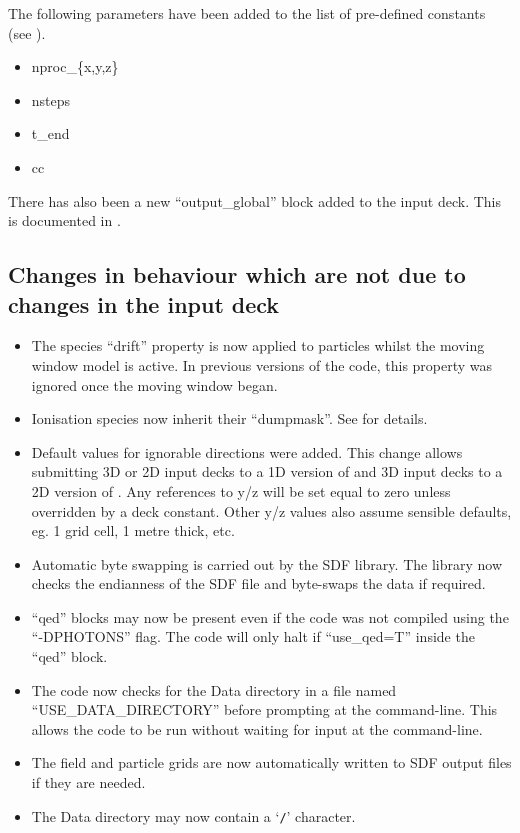 \noindent The following parameters have been added to the list of pre-defined
constants (see ).
\begin{itemize}
\item nproc\_\{x,y,z\}
\item nsteps
\item t\_end
\item cc
\end{itemize}
\bigskip

\noindent There has also been a new ``output\_global'' block added to the
input deck. This is documented in .

\subsection{Changes in behaviour which are not due to changes in the input deck}
\begin{itemize}
\item The species ``drift'' property is now applied to particles whilst the
  moving window model is active. In previous versions of the code, this
  property was ignored once the moving window began.
\item Ionisation species now inherit their ``dumpmask''. See 
  for details.
\item Default values for ignorable directions were added.
   This change allows submitting 3D or 2D input decks to a 1D
   version of {\EPOCH} and 3D input decks to a 2D version of {\EPOCH}.
   Any references to y/z will be set equal to zero unless overridden
   by a deck constant. Other y/z values also assume sensible
   defaults, eg. 1 grid cell, 1 metre thick, etc.
\item Automatic byte swapping is carried out by the SDF library.
   The library now checks the endianness of the SDF file and
   byte-swaps the data if required.
\item ``qed'' blocks may now be present even if the code was not compiled
   using the ``-DPHOTONS'' flag.
   The code will only halt if ``use\_qed=T'' inside the ``qed'' block.
\item The code now checks for the Data directory in a file named
   ``USE\_DATA\_DIRECTORY'' before prompting at the command-line. This allows
   the code to be run without waiting for input at the command-line.
\item The field and particle grids are now automatically written to SDF output
   files if they are needed.
\item The Data directory may now contain a `\verb|/|' character.
\end{itemize}


